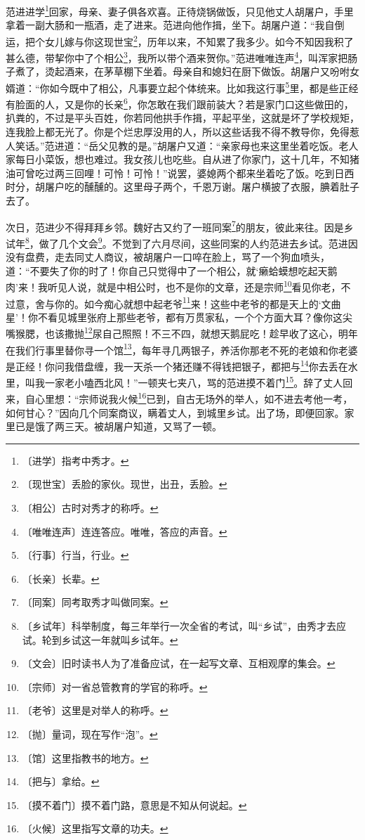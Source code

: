 \documentclass[12pt,UTF-8,openany]{ctexbook}
\begin{document}
\begin{normalsize}
    
    范进进学\footnote{〔进学〕指考中秀才。}回家，母亲、妻子俱各欢喜。正待烧锅做饭，只见他丈人胡屠户，手里拿着一副大肠和一瓶酒，走了进来。范进向他作揖，坐下。胡屠户道：“我自倒运，把个女儿嫁与你这现世宝\footnote{〔现世宝〕丢脸的家伙。现世，出丑，丢脸。}，历年以来，不知累了我多少。如今不知因我积了甚么德，带挈你中了个相公\footnote{〔相公〕古时对秀才的称呼。}，我所以带个酒来贺你。”范进唯唯连声\footnote{〔唯唯连声〕连连答应。唯唯，答应的声音。}，叫浑家把肠子煮了，烫起酒来，在茅草棚下坐着。母亲自和媳妇在厨下做饭。胡屠户又吩咐女婿道：“你如今既中了相公，凡事要立起个体统来。比如我这行事\footnote{〔行事〕行当，行业。}里，都是些正经有脸面的人，又是你的长亲\footnote{〔长亲〕长辈。}，你怎敢在我们跟前装大？若是家门口这些做田的，扒粪的，不过是平头百姓，你若同他拱手作揖，平起平坐，这就是坏了学校规矩，连我脸上都无光了。你是个烂忠厚没用的人，所以这些话我不得不教导你，免得惹人笑话。”范进道：“岳父见教的是。”胡屠户又道：“亲家母也来这里坐着吃饭。老人家每日小菜饭，想也难过。我女孩儿也吃些。自从进了你家门，这十几年，不知猪油可曾吃过两三回哩！可怜！可怜！”说罢，婆媳两个都来坐着吃了饭。吃到日西时分，胡屠户吃的醺醺的。这里母子两个，千恩万谢。屠户横披了衣服，腆着肚子去了。
    
    次日，范进少不得拜拜乡邻。魏好古又约了一班同案\footnote{〔同案〕同考取秀才叫做同案。}的朋友，彼此来往。因是乡试年\footnote{〔乡试年〕科举制度，每三年举行一次全省的考试，叫“乡试”，由秀才去应试。轮到乡试这一年就叫乡试年。}，做了几个文会\footnote{〔文会〕旧时读书人为了准备应试，在一起写文章、互相观摩的集会。}。不觉到了六月尽间，这些同案的人约范进去乡试。范进因没有盘费，走去同丈人商议，被胡屠户一口啐在脸上，骂了一个狗血喷头，道：“不要失了你的时了！你自己只觉得中了一个相公，就‘癞蛤蟆想吃起天鹅肉’来！我听见人说，就是中相公时，也不是你的文章，还是宗师\footnote{〔宗师〕对一省总管教育的学官的称呼。}看见你老，不过意，舍与你的。如今痴心就想中起老爷\footnote{〔老爷〕这里是对举人的称呼。}来！这些中老爷的都是天上的‘文曲星’！你不看见城里张府上那些老爷，都有万贯家私，一个个方面大耳？像你这尖嘴猴腮，也该撒抛\footnote{〔抛〕量词，现在写作“泡”。}尿自己照照！不三不四，就想天鹅屁吃！趁早收了这心，明年在我们行事里替你寻一个馆\footnote{〔馆〕这里指教书的地方。}，每年寻几两银子，养活你那老不死的老娘和你老婆是正经！你问我借盘缠，我一天杀一个猪还赚不得钱把银子，都把与\footnote{〔把与〕拿给。}你去丢在水里，叫我一家老小嗑西北风！”一顿夹七夹八，骂的范进摸不着门\footnote{〔摸不着门〕摸不着门路，意思是不知从何说起。}。辞了丈人回来，自心里想：“宗师说我火候\footnote{〔火候〕这里指写文章的功夫。}已到，自古无场外的举人，如不进去考他一考，如何甘心？”因向几个同案商议，瞒着丈人，到城里乡试。出了场，即便回家。家里已是饿了两三天。被胡屠户知道，又骂了一顿。
    

\end{normalsize}
\end{document}
